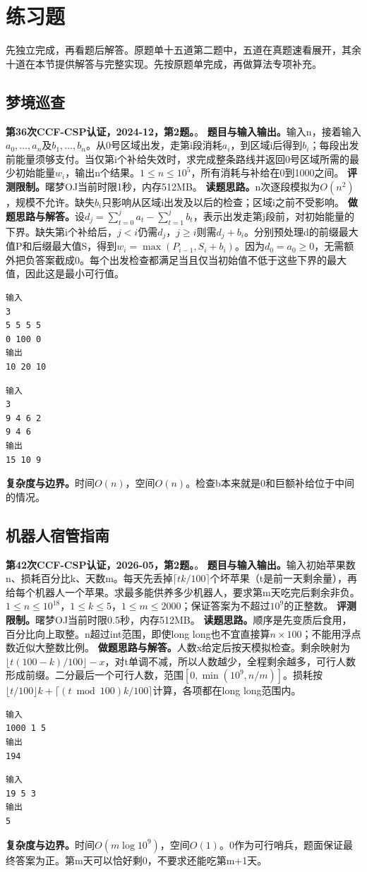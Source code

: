 \section{练习题}
先独立完成，再看题后解答。原题单十五道第二题中，五道在真题速看展开，其余十道在本节提供解答与完整实现。先按原题单完成，再做算法专项补充。
\subsection{梦境巡查}
\textbf{第36次CCF-CSP认证，2024-12，第2题。}。
\textbf{题目与输入输出。}输入n，接着输入$a_0,\ldots,a_n$及$b_1,\ldots,b_n$。从0号区域出发，走第i段消耗$a_i$，到区域i后得到$b_i$；每段出发前能量须够支付。当仅第i个补给失效时，求完成整条路线并返回0号区域所需的最少初始能量$w_i$，输出n个结果。$1\le n\le10^5$，所有消耗与补给在0到1000之间。
\textbf{评测限制。}曙梦OJ当前时限1秒，内存512MB。
\textbf{读题思路。}n次逐段模拟为$O(n^2)$，规模不允许。缺失$b_i$只影响从区域i出发及以后的检查；区域i之前不受影响。
\textbf{做题思路与解答。}设$d_j=\sum_{t=0}^j a_t-\sum_{t=1}^j b_t$，表示出发走第j段前，对初始能量的下界。缺失第i个补给后，$j<i$仍需$d_j$，$j\ge i$则需$d_j+b_i$。分别预处理d的前缀最大值P和后缀最大值S，得到$w_i=\max(P_{i-1},S_i+b_i)$。因为$d_0=a_0\ge0$，无需额外把负答案截成0。每个出发检查都满足当且仅当初始值不低于这些下界的最大值，因此这是最小可行值。
\begin{verbatim}
输入
3
5 5 5 5
0 100 0
输出
10 20 10
\end{verbatim}
\begin{verbatim}
输入
3
9 4 6 2
9 4 6
输出
15 10 9
\end{verbatim}
\textbf{复杂度与边界。}时间$O(n)$，空间$O(n)$。检查b本来就是0和巨额补给位于中间的情况。
\subsection{机器人宿管指南}
\textbf{第42次CCF-CSP认证，2026-05，第2题。}。
\textbf{题目与输入输出。}输入初始苹果数n、损耗百分比k、天数m。每天先丢掉$\lceil tk/100\rceil$个坏苹果（t是前一天剩余量），再给每个机器人一个苹果。求最多能供养多少机器人，要求第m天吃完后剩余非负。$1\le n\le10^{18}$，$1\le k\le5$，$1\le m\le2000$；保证答案为不超过$10^9$的正整数。
\textbf{评测限制。}曙梦OJ当前时限0.5秒，内存512MB。
\textbf{读题思路。}顺序是先变质后食用，百分比向上取整。n超过int范围，即使long long也不宜直接算$n\times100$；不能用浮点数近似大整数比例。
\textbf{做题思路与解答。}人数x给定后按天模拟检查。剩余映射为$\lfloor t(100-k)/100\rfloor-x$，对t单调不减，所以人数越少，全程剩余越多，可行人数形成前缀。二分最后一个可行人数，范围$[0,\min(10^9,n/m)]$。损耗按$\lfloor t/100\rfloor k+\lceil (t\bmod100)k/100\rceil$计算，各项都在long long范围内。
\begin{verbatim}
输入
1000 1 5
输出
194
\end{verbatim}
\begin{verbatim}
输入
19 5 3
输出
5
\end{verbatim}
\textbf{复杂度与边界。}时间$O(m\log 10^9)$，空间$O(1)$。0作为可行哨兵，题面保证最终答案为正。第m天可以恰好剩0，不要求还能吃第m+1天。

